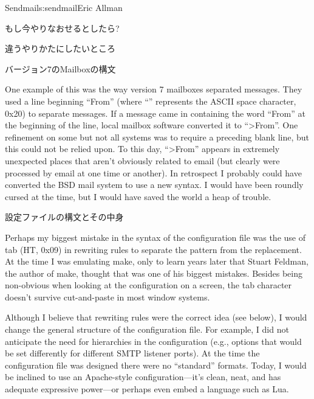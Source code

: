 \begin{aosachapter}{Sendmail}{s:sendmail}{Eric Allman}
\begin{aosasect1}{もし今やりなおせるとしたら?}
\begin{aosasect2}{違うやりかたにしたいところ}
\begin{aosasect3}{バージョン7のMailboxの構文}

One example of this was the way version 7 mailboxes separated
messages.  They used a line beginning ``From\textvisiblespace'' (where
``\textvisiblespace'' represents the ASCII space character, 0x20) to separate
messages. If a message came in containing the word ``From\textvisiblespace''
at the
beginning of the line, local mailbox software converted it to
``{\textgreater}From\textvisiblespace''.
One refinement on some but not all systems was
to require a preceding blank line, but this could not be relied
upon. To this day, ``{\textgreater}From'' appears in extremely
unexpected places that aren't obviously related to email (but clearly
were processed by email at one time or another). In retrospect I
probably could have converted the BSD mail system to use a new syntax.
I would have been roundly cursed at the time, but I would have saved
the world a heap of trouble.

\end{aosasect3}

\begin{aosasect3}{設定ファイルの構文とその中身}

Perhaps my biggest mistake in the syntax of the configuration file was
the use of tab (HT, 0x09) in rewriting rules
to separate the pattern from the
replacement.  At the time I was emulating make, only to learn years
later that Stuart Feldman, the author of make, thought that was one of
his biggest mistakes. Besides being non-obvious when looking at the
configuration on a screen, the tab character doesn't survive
cut-and-paste in most window systems.

Although I believe that rewriting rules were the correct idea (see
below), I would change the general structure of the configuration
file.  For example, I did not anticipate the need for hierarchies in
the configuration (e.g., options that would be set differently for
different SMTP listener ports). At the time the configuration file was
designed there were no ``standard'' formats. Today, I would be inclined
to use an Apache-style configuration---it's clean, neat, and has
adequate expressive power---or perhaps even embed a language such as Lua.


\end{aosasect3}
\end{aosasect2}
\end{aosasect1}
\end{aosachapter}
